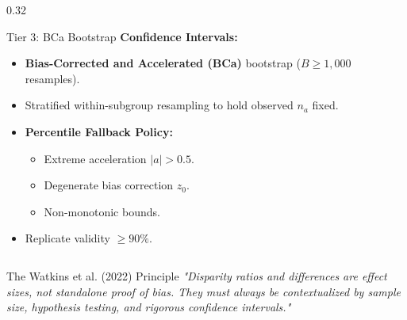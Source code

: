 \begin{frame}
\begin{columns}[T]
    \begin{column}{0.32\textwidth}
      \begin{successcard}{Tier 3: BCa Bootstrap}
        \footnotesize
        \textbf{Confidence Intervals:}
        \begin{itemize}\scriptsize
          \item \textbf{Bias-Corrected and Accelerated (BCa)} bootstrap ($B \ge 1,000$ resamples).
          \item Stratified within-subgroup resampling to hold observed $n_a$ fixed.
          \item \textbf{Percentile Fallback Policy:}
            \begin{itemize}\tiny
              \item Extreme acceleration $|a| > 0.5$.
              \item Degenerate bias correction $z_0$.
              \item Non-monotonic bounds.
            \end{itemize}
          \item Replicate validity $\ge 90\%$.
        \end{itemize}
      \end{successcard}
    \end{column}
  \end{columns}

  \vspace{0.2cm}
  \begin{alertcard}{The Watkins et al. (2022) Principle}
    \footnotesize \textit{"Disparity ratios and differences are effect sizes, not standalone proof of bias. They must always be contextualized by sample size, hypothesis testing, and rigorous confidence intervals."}
  \end{alertcard}
\end{frame}
